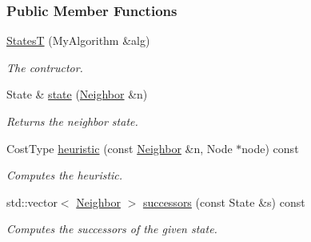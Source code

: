 \subsubsection*{Public Member Functions}
\begin{DoxyCompactItemize}
\item 
\hyperlink{structslb_1_1ext_1_1policy_1_1generator_1_1StatesT_a31e1dbd50128ac105774047963a609ea}{StatesT} (My\+Algorithm \&alg)
\begin{DoxyCompactList}\small\item\em The contructor. \end{DoxyCompactList}\item 
State \& \hyperlink{structslb_1_1ext_1_1policy_1_1generator_1_1StatesT_a2a27494946b73fcd9735cdc7515cab74}{state} (\hyperlink{structslb_1_1ext_1_1policy_1_1generator_1_1StatesT_aabbc05d367ac5da87108f453240e6a32}{Neighbor} \&n)
\begin{DoxyCompactList}\small\item\em Returns the neighbor state. \end{DoxyCompactList}\item 
Cost\+Type \hyperlink{structslb_1_1ext_1_1policy_1_1generator_1_1StatesT_ae0e0c092fbdd54178dfd1a4e533bf18a}{heuristic} (const \hyperlink{structslb_1_1ext_1_1policy_1_1generator_1_1StatesT_aabbc05d367ac5da87108f453240e6a32}{Neighbor} \&n, Node $\ast$node) const 
\begin{DoxyCompactList}\small\item\em Computes the heuristic. \end{DoxyCompactList}\item 
std\+::vector$<$ \hyperlink{structslb_1_1ext_1_1policy_1_1generator_1_1StatesT_aabbc05d367ac5da87108f453240e6a32}{Neighbor} $>$ \hyperlink{structslb_1_1ext_1_1policy_1_1generator_1_1StatesT_afcc580d521281be21501972541911aa1}{successors} (const State \&s) const 
\begin{DoxyCompactList}\small\item\em Computes the successors of the given state. \end{DoxyCompactList}\end{DoxyCompactItemize}
